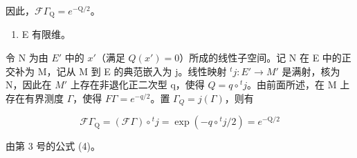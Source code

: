 因此，\(\mathcal{F}\Gamma_{\mathrm{Q}} = e^{-\mathrm{Q} / 2}\)。

\begin{enumerate}
\def\labelenumi{\Alph{enumi})}
\setcounter{enumi}{1}
\tightlist
\item
  E 有限维。
\end{enumerate}

令 N 为由 \(E'\) 中的 \(x'\)（满足 \(Q(x') = 0\)）所成的线性子空间。记 N 在 E 中的正交补为 M，记从 M 到 E 的典范嵌入为 j。线性映射 \({}^{t}j : E' \to M'\) 是满射，核为 N，因此在 \(M'\) 上存在非退化正二次型 q，使得 \(Q = q \circ {}^{t}j\)。由前面所述，在 M 上存在有界测度 \(\Gamma\)，使得 \(F\Gamma = e^{-q/2}\)。置 \(\Gamma_{Q} = j(\Gamma)\)，则有

\[
\mathcal {F} \Gamma_ {\mathrm{Q}} = (\mathcal {F} \Gamma) \circ {} ^ {t} j = \exp (- q \circ {} ^ {t} j / 2) = e ^ {- \mathrm{Q} / 2}
\]

由第 3 号的公式 (4)。
